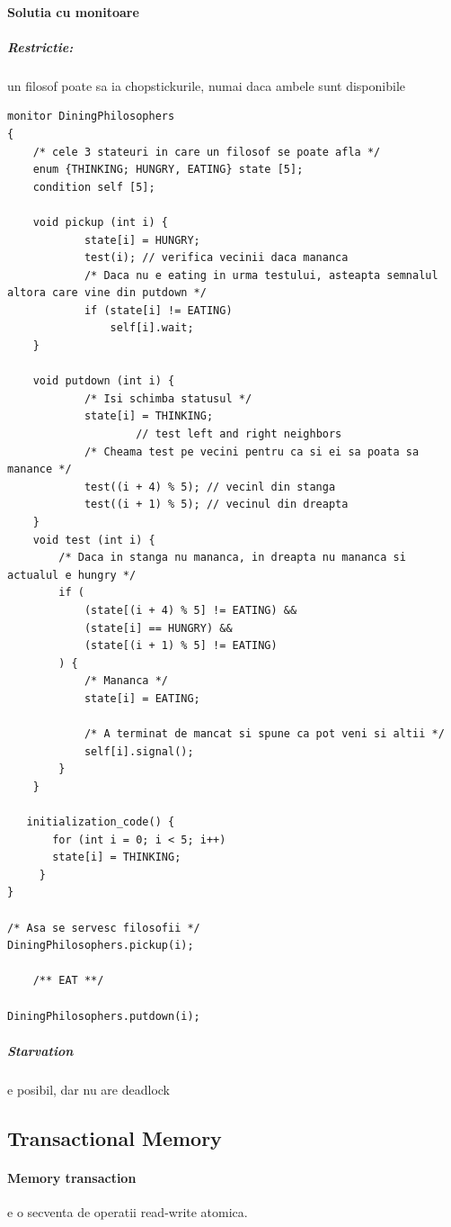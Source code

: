 \documentclass{article}
\begin{document}
\paragraph*{Solutia cu monitoare}
\subparagraph*{Restrictie:} un filosof poate sa ia chopstickurile, numai daca ambele sunt disponibile
\begin{center}
    \begin{lstlisting}
monitor DiningPhilosophers
{ 
    /* cele 3 stateuri in care un filosof se poate afla */
    enum {THINKING; HUNGRY, EATING} state [5]; 
    condition self [5];

    void pickup (int i) { 
            state[i] = HUNGRY;
            test(i); // verifica vecinii daca mananca
            /* Daca nu e eating in urma testului, asteapta semnalul altora care vine din putdown */
            if (state[i] != EATING)
                self[i].wait;
    }
    
    void putdown (int i) { 
            /* Isi schimba statusul */
            state[i] = THINKING;
                    // test left and right neighbors
            /* Cheama test pe vecini pentru ca si ei sa poata sa manance */
            test((i + 4) % 5); // vecinl din stanga
            test((i + 1) % 5); // vecinul din dreapta
    }
    void test (int i) { 
        /* Daca in stanga nu mananca, in dreapta nu mananca si actualul e hungry */
        if (
            (state[(i + 4) % 5] != EATING) &&
            (state[i] == HUNGRY) &&
            (state[(i + 1) % 5] != EATING) 
        ) { 
            /* Mananca */
            state[i] = EATING;

            /* A terminat de mancat si spune ca pot veni si altii */
            self[i].signal();
        }
    }

   initialization_code() { 
       for (int i = 0; i < 5; i++)
       state[i] = THINKING;
     }
}

/* Asa se servesc filosofii */
DiningPhilosophers.pickup(i);

    /** EAT **/

DiningPhilosophers.putdown(i);
    \end{lstlisting}
\end{center}

\subparagraph*{Starvation} e posibil, dar nu are deadlock

\subsection*{Transactional Memory}
\paragraph*{Memory transaction} e o secventa de operatii read-write atomica.
\end{document}
